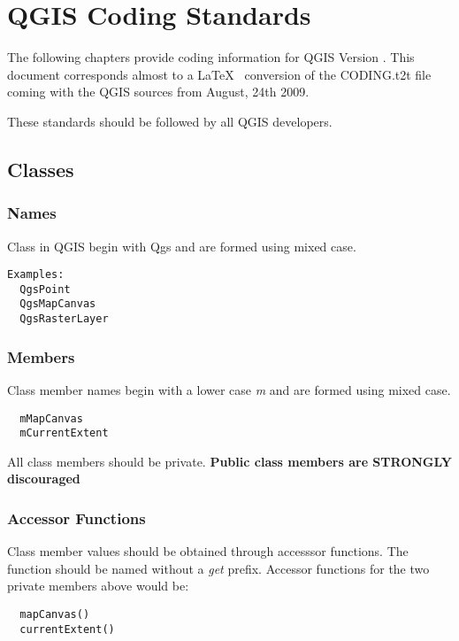 

\section{QGIS Coding Standards}

The following chapters provide coding information for QGIS Version \CURRENT.
This document corresponds almost to a \LaTeX~ conversion of the CODING.t2t
file coming with the QGIS sources from August, 24th 2009.

These standards should be followed by all QGIS developers.

\subsection{Classes}
\subsubsection{Names}
Class in QGIS begin with Qgs and are formed using mixed case. 

\begin{verbatim}
Examples:
  QgsPoint
  QgsMapCanvas
  QgsRasterLayer
\end{verbatim}

\subsubsection{Members}
Class member names begin with a lower case \textit{m} and are formed using mixed
case.

\begin{verbatim}
  mMapCanvas  
  mCurrentExtent
\end{verbatim}

All class members should be private.
\textbf{Public class members are STRONGLY discouraged}

\subsubsection{Accessor Functions}
Class member values should be obtained through accesssor functions. The
function should be named without a \textit{get} prefix. Accessor functions for the
two private members above would be: 

\begin{verbatim}
  mapCanvas()
  currentExtent()
\end{verbatim}

